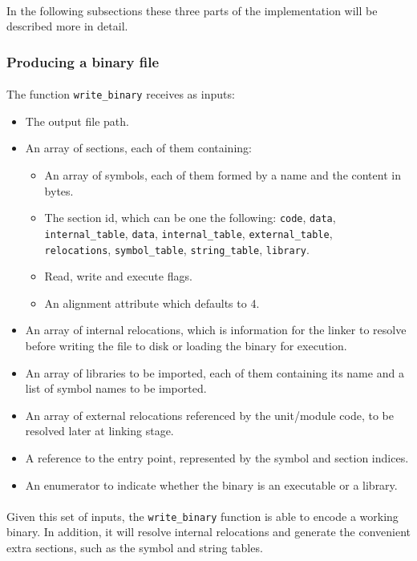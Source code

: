 \documentclass[12pt]{article}
\begin{document}
	\paragraph{}In the following subsections these three parts of the implementation will be described more in detail.
	
	\subsubsection{Producing a binary file}
	\paragraph{}
	The function \verb|write_binary| receives as inputs:
	\begin{itemize}
		\item The output file path.
		\item An array of sections, each of them containing:
		\begin{itemize}
			\item An array of symbols, each of them formed by a name and the content in bytes.
			\item The section id, which can be one the following: \verb|code|, \verb|data|, \verb|internal_table|, \verb|data|, \verb|internal_table|, \verb|external_table|,\\ \verb|relocations|, \verb|symbol_table|, \verb|string_table|, \verb|library|.
			\item Read, write and execute flags.
			\item An alignment attribute which defaults to 4.
		\end{itemize}
		\item An array of internal relocations, which is information for the linker to resolve before writing the file to disk or loading the binary for execution.
		\item An array of libraries to be imported, each of them containing its name and a list of symbol names to be imported.
		\item An array of external relocations referenced by the unit/module code, to be resolved later at linking stage.
		\item A reference to the entry point, represented by the symbol and section indices.
		\item An enumerator to indicate whether the binary is an executable or a library.
	\end{itemize}
	\paragraph{}Given this set of inputs, the \verb|write_binary| function is able to encode a working binary. In addition, it will resolve internal relocations and generate the convenient extra sections, such as the symbol and string tables.
	
\end{document}

